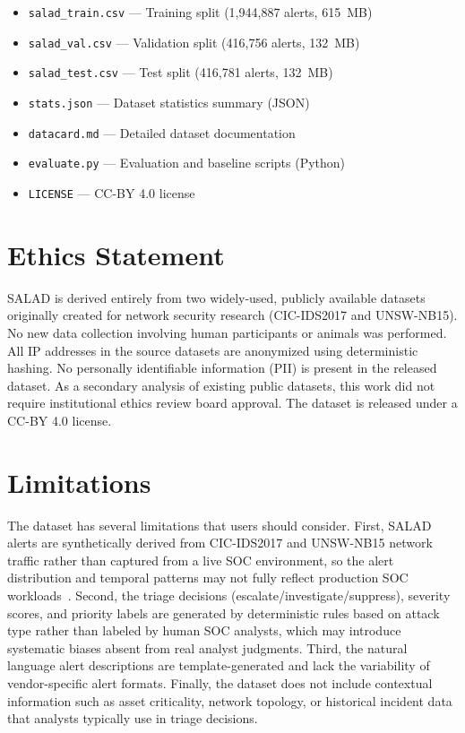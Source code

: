 \documentclass[review]{elsarticle}
\begin{document}
\begin{itemize}
\item \texttt{salad\_train.csv} --- Training split (1,944,887 alerts, 615~MB)
\item \texttt{salad\_val.csv} --- Validation split (416,756 alerts, 132~MB)
\item \texttt{salad\_test.csv} --- Test split (416,781 alerts, 132~MB)
\item \texttt{stats.json} --- Dataset statistics summary (JSON)
\item \texttt{datacard.md} --- Detailed dataset documentation
\item \texttt{evaluate.py} --- Evaluation and baseline scripts (Python)
\item \texttt{LICENSE} --- CC-BY 4.0 license
\end{itemize}


\section{Ethics Statement}

SALAD is derived entirely from two widely-used, publicly available datasets originally created for network security research (CIC-IDS2017 and UNSW-NB15). No new data collection involving human participants or animals was performed. All IP addresses in the source datasets are anonymized using deterministic hashing. No personally identifiable information (PII) is present in the released dataset. As a secondary analysis of existing public datasets, this work did not require institutional ethics review board approval. The dataset is released under a CC-BY 4.0 license.


\section{Limitations}

The dataset has several limitations that users should consider. First, SALAD alerts are synthetically derived from CIC-IDS2017 and UNSW-NB15 network traffic rather than captured from a live SOC environment, so the alert distribution and temporal patterns may not fully reflect production SOC workloads~\cite{ring2019ids_datasets}. Second, the triage decisions (escalate/investigate/suppress), severity scores, and priority labels are generated by deterministic rules based on attack type rather than labeled by human SOC analysts, which may introduce systematic biases absent from real analyst judgments. Third, the natural language alert descriptions are template-generated and lack the variability of vendor-specific alert formats. Finally, the dataset does not include contextual information such as asset criticality, network topology, or historical incident data that analysts typically use in triage decisions.
\end{document}
